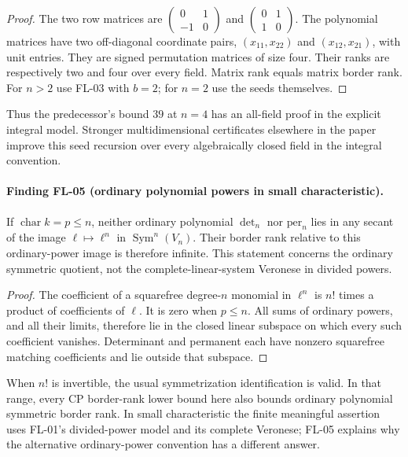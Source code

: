 \begin{proof}
The two row matrices are
$\left(\begin{smallmatrix}0&1\\-1&0\end{smallmatrix}\right)$
and $\left(\begin{smallmatrix}0&1\\1&0\end{smallmatrix}\right)$.
The polynomial matrices have two off-diagonal coordinate pairs,
$(x_{11},x_{22})$ and $(x_{12},x_{21})$, with unit entries.
They are signed permutation matrices of size four. Their ranks
are respectively two and four over every field. Matrix rank
equals matrix border rank. For $n>2$ use FL-03 with $b=2$;
for $n=2$ use the seeds themselves.
\end{proof}

Thus the predecessor's bound $39$ at $n=4$ has an all-field
proof in the explicit integral model. Stronger multidimensional
certificates elsewhere in the paper improve this seed recursion
over every algebraically closed field in the integral convention.

\paragraph{Finding FL-05 (ordinary polynomial powers in small characteristic).}
If $\operatorname{char}k=p\leq n$, neither ordinary polynomial
$\det_n$ nor $\mathrm{per}_n$ lies in any secant of the image
$\ell\mapsto\ell^n$ in $\operatorname{Sym}^n(V_n)$.
Their border rank relative to this ordinary-power image is
therefore infinite. This statement concerns the ordinary symmetric
quotient, not the complete-linear-system Veronese in divided powers.

\begin{proof}
The coefficient of a squarefree degree-$n$ monomial in $\ell^n$
is $n!$ times a product of coefficients of $\ell$. It is zero
when $p\leq n$. All sums of ordinary powers, and all their limits,
therefore lie in the closed linear subspace on which every such
coefficient vanishes. Determinant and permanent each have nonzero
squarefree matching coefficients and lie outside that subspace.
\end{proof}

When $n!$ is invertible, the usual symmetrization identification
is valid. In that range, every CP border-rank lower bound here
also bounds ordinary polynomial symmetric border rank. In small
characteristic the finite meaningful assertion uses FL-01's
divided-power model and its complete Veronese; FL-05 explains why
the alternative ordinary-power convention has a different answer.
